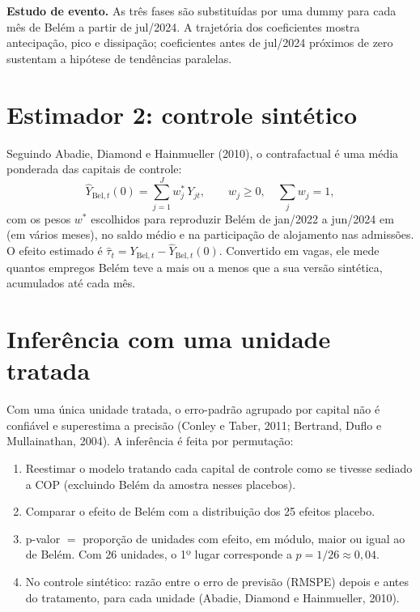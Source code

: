 \textbf{Estudo de evento.} As três fases são substituídas por uma dummy para cada mês de Belém a partir
de jul/2024. A trajetória dos coeficientes mostra antecipação, pico e dissipação; coeficientes antes de
jul/2024 próximos de zero sustentam a hipótese de tendências paralelas.


\section{Estimador 2: controle sintético}

Seguindo Abadie, Diamond e Hainmueller (2010), o contrafactual é uma média ponderada das capitais de
controle:
\begin{equation}
\hat Y_{\text{Bel},t}(0) = \sum_{j=1}^{J} w_j^{*}\, Y_{jt}, \qquad w_j \geq 0,\quad \sum_j w_j = 1,
\end{equation}
com os pesos $w^{*}$ escolhidos para reproduzir Belém de jan/2022 a jun/2024 em  (em
vários meses), no saldo médio e na participação de alojamento nas admissões. O efeito estimado é
$\hat\tau_t = Y_{\text{Bel},t} - \hat Y_{\text{Bel},t}(0)$. Convertido em vagas, ele mede quantos
empregos Belém teve a mais ou a menos que a sua versão sintética, acumulados até cada mês.


\section{Inferência com uma unidade tratada}

Com uma única unidade tratada, o erro-padrão agrupado por capital não é confiável e superestima a
precisão (Conley e Taber, 2011; Bertrand, Duflo e Mullainathan, 2004). A inferência é feita por
permutação:

\begin{enumerate}[leftmargin=*]
  \item Reestimar o modelo tratando cada capital de controle como se tivesse sediado a COP (excluindo
        Belém da amostra nesses placebos).
  \item Comparar o efeito de Belém com a distribuição dos 25 efeitos placebo.
  \item p-valor $=$ proporção de unidades com efeito, em módulo, maior ou igual ao de Belém. Com 26
        unidades, o 1º lugar corresponde a $p = 1/26 \approx 0{,}04$.
  \item No controle sintético: razão entre o erro de previsão (RMSPE) depois e antes do tratamento,
        para cada unidade (Abadie, Diamond e Hainmueller, 2010).
\end{enumerate}

